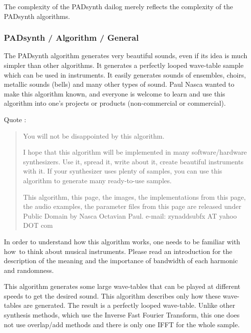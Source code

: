    The complexity of the PADsynth dailog merely reflects the complexity of the
   PADsynth algorithms.

\subsubsection{PADsynth / Algorithm / General}
\label{subsubsec:padsynth_algorithm_general}

   The PADsynth algorithm generates very beautiful sounds, even if its idea is
   much simpler than other algorithms. It generates a perfectly looped
   wave-table sample which can be used in instruments. It easily generates
   sounds of ensembles, choirs, metallic sounds (bells) and many other types of
   sound.  Paul Nasca wanted to make this algorithm known, and everyone is
   welcome to learn and use this algorithm into one's projects or products
   (non-commercial or commercial).

   Quote \cite{zyndoc}:

   \begin{quotation}
      You will not be disappointed by this algorithm.

      I hope that this algorithm will be implemented in many software/hardware
      synthesizers. Use it, spread it, write about it, create beautiful
      instruments with it. If your synthesizer uses plenty of samples, you can
      use this algorithm to generate many ready-to-use samples.

      This algorithm, this page, the images, the implementations from this
      page, the audio examples, the parameter files from this page
      are released under Public Domain by Nasca Octavian Paul.
      e-mail: zynaddsubfx AT yahoo DOT com
   \end{quotation}

   In order to understand how this algorithm works, one needs to be familiar
   with how to think about musical instruments. Please read an introduction
   for the description of the meaning and the importance of bandwidth of each
   harmonic and randomness.

   This algorithm generates some large wave-tables that can be played at
   different speeds to get the desired sound. This algorithm describes only
   how these wave-tables are generated. The result is a perfectly looped
   wave-table.  Unlike other synthesis methods, which use the
   Inverse Fast Fourier Transform, this one does not use overlap/add methods
   and there is only one IFFT for the whole sample.

